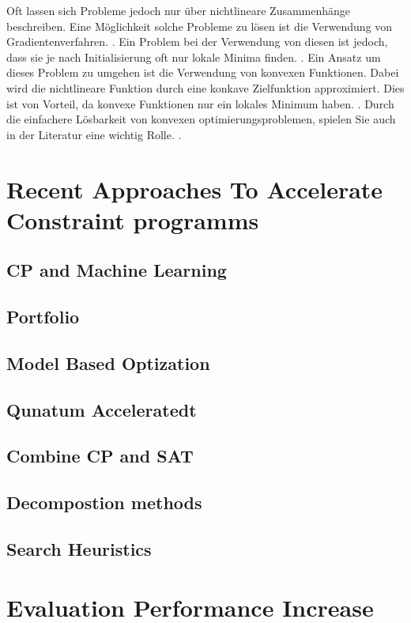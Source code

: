 Oft lassen sich Probleme jedoch nur über nichtlineare Zusammenhänge beschreiben.
Eine Möglichkeit solche Probleme zu lösen ist die Verwendung von
Gradientenverfahren. \cite[153]{marti21bo}. Ein Problem bei der Verwendung von
diesen ist jedoch, dass sie je nach Initialisierung oft nur lokale Minima
finden. \cite[9]{boyd04bo}. Ein Ansatz um dieses Problem zu umgehen ist die
Verwendung von konvexen Funktionen. Dabei wird die nichtlineare Funktion durch
eine konkave Zielfunktion approximiert. \cite[11]{boyd04bo} Dies ist von
Vorteil, da konvexe Funktionen nur ein lokales Minimum haben.
\cite[7]{noced06bo}. Durch die einfachere Lösbarkeit von konvexen
optimierungsproblemen, spielen Sie auch in der Literatur eine wichtig Rolle.
\cite[8]{boyd04bo}. 



\section{Recent Approaches To Accelerate Constraint programms}
\label{sec:Recent Approaches To Accelerate Constraint programms}


\subsection{CP and Machine Learning}
\label{sec:CP and Machine Learning}

  
\subsection{Portfolio}
\label{sec:Portfolio}

  
\subsection{Model Based Optization}
\label{sec:Model Based Optization}

  
\subsection{Qunatum Acceleratedt}
\label{sec:Qunatum Accelerated}

  
\subsection{Combine CP and SAT}
\label{sec:Combine CP and SAT}

  
\subsection{Decompostion methods}
\label{sec:Decompostion methods}

  
\subsection{Search Heuristics}
\label{sec:Search Heuristics}


\section{Evaluation Performance Increase}
\label{sec:Evaluation Performance Increase}


\printbibliography[heading=bibintoc]





